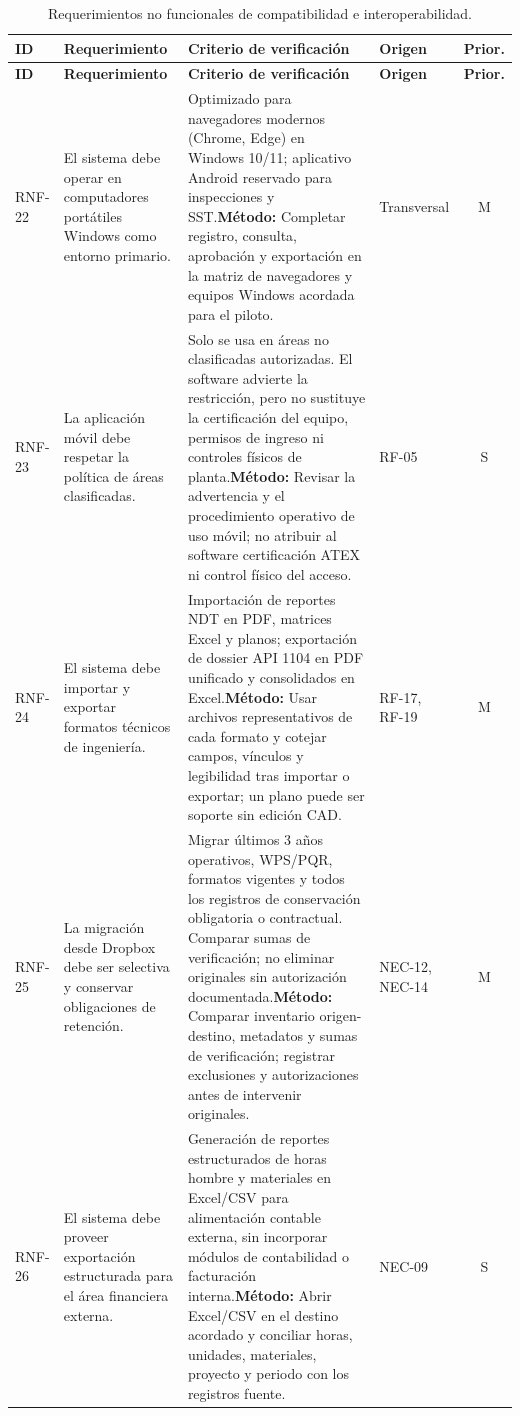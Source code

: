 \documentclass[12pt,letterpaper]{article}
\begin{document}
{\small
\begin{longtable}{@{}L{1.8cm} L{4.65cm} L{4.75cm} L{2.1cm} c@{}}
\caption{Requerimientos no funcionales de compatibilidad e interoperabilidad.}\\
\toprule{}
\textbf{ID} & \textbf{Requerimiento} & \textbf{Criterio de verificación} & \textbf{Origen} & \textbf{Prior.} \\
\midrule
\endfirsthead
\toprule{}
\textbf{ID} & \textbf{Requerimiento} & \textbf{Criterio de verificación} & \textbf{Origen} & \textbf{Prior.} \\
\midrule
\endhead
\bottomrule
\endfoot
RNF-22 & El sistema debe operar en computadores portátiles Windows como entorno primario. & Optimizado para navegadores modernos (Chrome, Edge) en Windows 10/11; aplicativo Android reservado para inspecciones y SST.\newline \textbf{Método:} Completar registro, consulta, aprobación y exportación en la matriz de navegadores y equipos Windows acordada para el piloto. & Transversal & M \\
RNF-23 & La aplicación móvil debe respetar la política de áreas clasificadas. & Solo se usa en áreas no clasificadas autorizadas. El software advierte la restricción, pero no sustituye la certificación del equipo, permisos de ingreso ni controles físicos de planta.\newline \textbf{Método:} Revisar la advertencia y el procedimiento operativo de uso móvil; no atribuir al software certificación ATEX ni control físico del acceso. & RF-05 & S \\
RNF-24 & El sistema debe importar y exportar formatos técnicos de ingeniería. & Importación de reportes NDT en PDF, matrices Excel y planos; exportación de dossier API 1104 en PDF unificado y consolidados en Excel.\newline \textbf{Método:} Usar archivos representativos de cada formato y cotejar campos, vínculos y legibilidad tras importar o exportar; un plano puede ser soporte sin edición CAD. & RF-17, RF-19 & M \\
RNF-25 & La migración desde Dropbox debe ser selectiva y conservar obligaciones de retención. & Migrar últimos 3 años operativos, WPS/PQR, formatos vigentes y todos los registros de conservación obligatoria o contractual. Comparar sumas de verificación; no eliminar originales sin autorización documentada.\newline \textbf{Método:} Comparar inventario origen-destino, metadatos y sumas de verificación; registrar exclusiones y autorizaciones antes de intervenir originales. & NEC-12, NEC-14 & M \\
RNF-26 & El sistema debe proveer exportación estructurada para el área financiera externa. & Generación de reportes estructurados de horas hombre y materiales en Excel/CSV para alimentación contable externa, sin incorporar módulos de contabilidad o facturación interna.\newline \textbf{Método:} Abrir Excel/CSV en el destino acordado y conciliar horas, unidades, materiales, proyecto y periodo con los registros fuente. & NEC-09 & S \\
\end{longtable}
}
\end{document}
